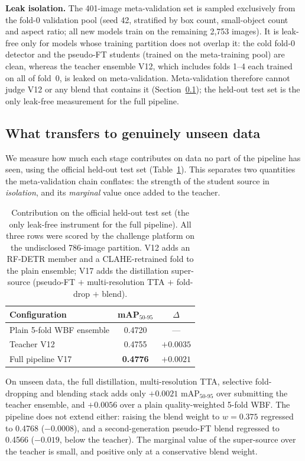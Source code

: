 \documentclass{article}
\begin{document}
\textbf{Leak isolation.} The 401-image meta-validation set is sampled
exclusively from the fold-0 validation pool (seed 42, stratified by box
count, small-object count and aspect ratio; all new models train on the
remaining 2{,}753 images). It is leak-free only for models whose
training partition does not overlap it: the cold fold-0 detector and
the pseudo-FT students (trained on the meta-training pool) are clean,
whereas the teacher ensemble V12, which includes folds 1--4 each
trained on all of fold~0, is leaked on meta-validation. Meta-validation
therefore cannot judge V12 or any blend that contains it
(Section~\ref{sec:heldout}); the held-out test set is the only
leak-free measurement for the full pipeline.

\subsection{What transfers to genuinely unseen data}
\label{sec:heldout}

We measure how much each stage contributes on data no part of the
pipeline has seen, using the official held-out test set
(Table~\ref{tab:heldout}). This separates two quantities the
meta-validation chain conflates: the strength of the student source in
\emph{isolation}, and its \emph{marginal} value once added to the
teacher.

\begin{table}[t]
\centering
\caption{Contribution on the official held-out test set (the only
leak-free instrument for the full pipeline). All three rows were scored
by the challenge platform on the undisclosed 786-image partition. V12
adds an RF-DETR member and a CLAHE-retrained fold to the plain
ensemble; V17 adds the distillation super-source (pseudo-FT $+$
multi-resolution TTA $+$ fold-drop $+$ blend).}
\label{tab:heldout}
\small
\begin{tabular}{lcc}
\toprule
\textbf{Configuration} & \textbf{mAP$_{50\text{-}95}$} & $\Delta$ \\
\midrule
Plain 5-fold WBF ensemble & 0.4720 & --- \\
Teacher V12               & 0.4755 & $+0.0035$ \\
Full pipeline V17         & \textbf{0.4776} & $+0.0021$ \\
\bottomrule
\end{tabular}
\end{table}

On unseen data, the full distillation, multi-resolution TTA, selective
fold-dropping and blending stack adds only $+0.0021$
mAP$_{50\text{-}95}$ over submitting the teacher ensemble, and
$+0.0056$ over a plain quality-weighted 5-fold WBF. The pipeline does
not extend either: raising the blend weight to $w{=}0.375$ regressed to
0.4768 ($-0.0008$), and a second-generation pseudo-FT blend regressed
to 0.4566 ($-0.019$, below the teacher). The marginal value of the
super-source over the teacher is small, and positive only at a
conservative blend weight.
\end{document}
